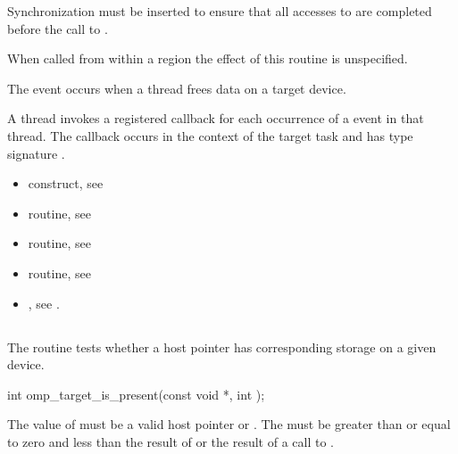 \begin{ccppspecific}
Synchronization must be inserted to ensure that all accesses to
 are completed before the call to .

When called from within a  region the effect of this routine
is unspecified.

\events
The  event occurs when a thread frees data on a target device.

\tools
A thread invokes a registered 
callback for each occurrence of a  event in that 
thread. The callback occurs in the context of the target task and has 
type signature .

\crossreferences
\begin{itemize}
\item {} construct, see

\item {} routine, see

\item {} routine, see

\item {} routine, see

\item {}, see
.

\end{itemize}



\subsection{}
\label{subsec:omp_target_is_present}
\summary

The  routine tests whether a host pointer
has corresponding storage on a given device.

\format
\begin{ompcFunction}
int omp_target_is_present(const void *, int );
\end{ompcFunction}

\constraints
The value of  must be a valid host pointer or .
The 
must be greater than or equal to zero and less than the result of
 or the result of a call to
.


\end{ccppspecific}
